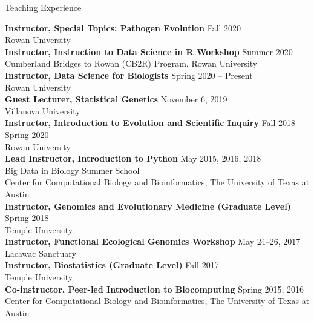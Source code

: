 \documentclass{resume} %
\begin{document}
\vspace*{0.5cm} 
\begin{rSection}{Teaching Experience}
\vspace*{0.25cm}

\textbf{Instructor, Special Topics: Pathogen Evolution} \hfill Fall 2020 \\ Rowan University \\

\textbf{Instructor, Instruction to Data Science in R Workshop} \hfill Summer 2020 \\ Cumberland Bridges to Rowan (CB2R) Program, Rowan University \\

\textbf{Instructor, Data Science for Biologists} \hfill Spring 2020 -- Present  \\ Rowan University \\

\textbf{Guest Lecturer, Statistical Genetics} \hfill November 6, 2019 \\ Villanova University \\ 

\textbf{Instructor, Introduction to Evolution and Scientific Inquiry} \hfill Fall 2018 -- Spring 2020  \\ Rowan University \\

\textbf{Lead Instructor, Introduction to Python} \hfill May 2015, 2016, 2018 \\ Big Data in Biology Summer School \\ Center for Computational Biology and Bioinformatics, The University of Texas at Austin \\

\textbf{Instructor, Genomics and Evolutionary Medicine (Graduate Level)} \hfill Spring 2018 \\ Temple University \\

\textbf{Instructor, Functional Ecological Genomics Workshop} \hfill May 24--26, 2017 \\ Lacawac Sanctuary \\

\textbf{Instructor, Biostatistics (Graduate Level)} \hfill Fall 2017 \\ Temple University \\

\textbf{Co-instructor, Peer-led Introduction to Biocomputing} \hfill Spring 2015, 2016 \\ Center for Computational Biology and Bioinformatics, The University of Texas at Austin \\


\end{rSection}
\end{document}
